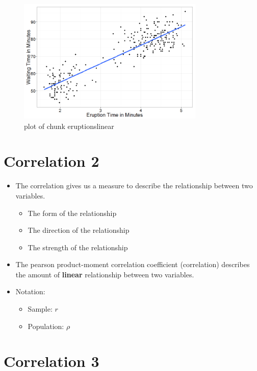 \documentclass[12pt]{article}
\begin{document}
\begin{figure}[H]
\centering
\includegraphics[width=3.5in]{figure/eruptionslinear-1.png}
\caption{plot of chunk eruptionslinear}
\end{figure}

\section{Correlation 2}\label{correlation-2}

\begin{itemize}
\itemsep1pt\parskip0pt
\item
  The correlation gives us a measure to describe the relationship
  between two variables.

  \begin{itemize}
  \itemsep1pt\parskip0pt
  \item
    The form of the relationship
  \item
    The direction of the relationship
  \item
    The strength of the relationship
  \end{itemize}
\item
  The pearson product-moment correlation coefficient (correlation)
  describes the amount of \textbf{linear} relationship between two
  variables.
\item
  Notation:

  \begin{itemize}
  \itemsep1pt\parskip0pt
  \item
    Sample: \(r\)
  \item
    Population: \(\rho\)
  \end{itemize}
\end{itemize}

\section{Correlation 3}\label{correlation-3}
\end{document}
